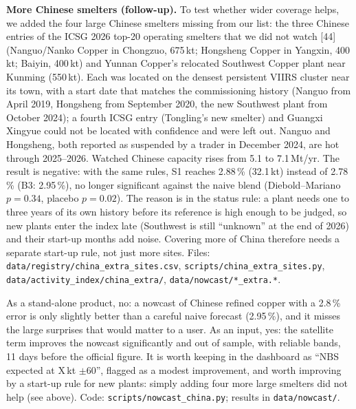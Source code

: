 \documentclass[10pt,a4paper]{article}
\newcommand{\code}[1]{\texttt{\small #1}}
\begin{document}
\textbf{More Chinese smelters (follow-up).} To test whether wider coverage helps, we added the four large Chinese smelters missing from our list: the three Chinese entries of the ICSG 2026 top-20 operating smelters that we did not watch [44] (Nanguo/Nanko Copper in Chongzuo, 675\,kt; Hongsheng Copper in Yangxin, 400\,kt; Baiyin, 400\,kt) and Yunnan Copper's relocated Southwest Copper plant near Kunming (550\,kt). Each was located on the densest persistent VIIRS cluster near its town, with a start date that matches the commissioning history (Nanguo from April 2019, Hongsheng from September 2020, the new Southwest plant from October 2024); a fourth ICSG entry (Tongling's new smelter) and Guangxi Xingyue could not be located with confidence and were left out. Nanguo and Hongsheng, both reported as suspended by a trader in December 2024, are hot through 2025--2026. Watched Chinese capacity rises from 5.1 to 7.1\,Mt/yr. The result is negative: with the same rules, S1 reaches 2.88\,\% (32.1\,kt) instead of 2.78\,\% (B3: 2.95\,\%), no longer significant against the naive blend (Diebold--Mariano $p=0.34$, placebo $p=0.02$). The reason is in the status rule: a plant needs one to three years of its own history before its reference is high enough to be judged, so new plants enter the index late (Southwest is still ``unknown'' at the end of 2026) and their start-up months add noise. Covering more of China therefore needs a separate start-up rule, not just more sites. Files: \code{data/registry/china\_extra\_sites.csv}, \code{scripts/china\_extra\_sites.py}, \code{data/activity\_index/china\_extra/}, \code{data/nowcast/*\_extra.*}.

\begin{notebox}
As a stand-alone product, no: a nowcast of Chinese refined copper with a 2.8\,\% error is only slightly better than a careful naive forecast (2.95\,\%), and it misses the large surprises that would matter to a user. As an input, yes: the satellite term improves the nowcast significantly and out of sample, with reliable bands, 11 days before the official figure. It is worth keeping in the dashboard as ``NBS expected at X\,kt $\pm$60'', flagged as a modest improvement, and worth improving by a start-up rule for new plants: simply adding four more large smelters did not help (see above). Code: \code{scripts/nowcast\_china.py}; results in \code{data/nowcast/}.
\end{notebox}

\end{document}
